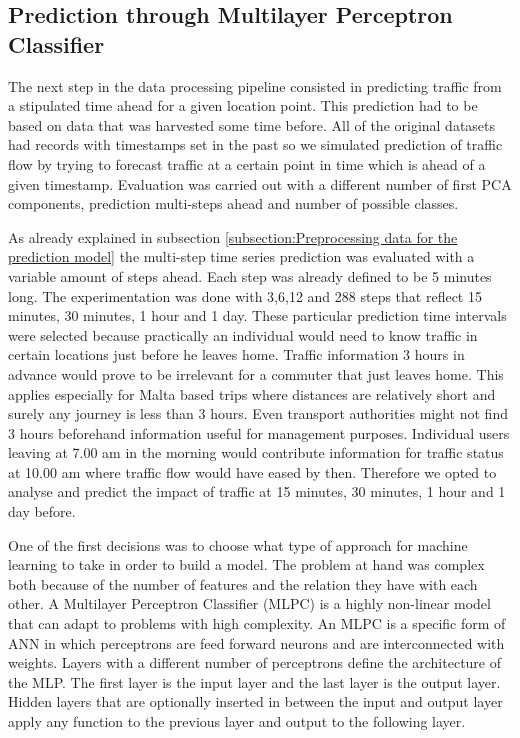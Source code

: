 \documentclass[12pt, a4paper]{report}
\theoremstyle{definition}
\theoremstyle{definition}%
\theoremstyle{definition}%
\theoremstyle{definition}%
\theoremstyle{definition}%
\theoremstyle{definition}%
\begin{document}
\subsection{Prediction through Multilayer Perceptron Classifier}


The next step in the data processing pipeline consisted in predicting traffic from a stipulated time ahead for a given location point. This prediction had to be based on data that was harvested some time before. All of the original datasets had records with timestamps set  in the past so we simulated prediction of traffic flow by trying to forecast traffic at a certain point in time which is ahead of a given timestamp. Evaluation was carried out with a different number of first PCA components, prediction multi-steps ahead and number of possible classes.

As already explained in subsection \ref{subsection:Preprocessing data for the prediction model} the multi-step time series prediction was evaluated with a variable amount of steps ahead. Each step was already defined to be 5 minutes long. The experimentation was done with 3,6,12 and 288 steps that reflect 15 minutes, 30 minutes, 1 hour and 1 day. These particular prediction time intervals were selected because practically an individual would need to know traffic in certain locations just before he leaves home. Traffic information 3 hours in advance would prove to be irrelevant for a commuter that just leaves home. This applies especially for Malta based trips where distances are relatively short and surely any journey is less than 3 hours. Even transport authorities might not find 3 hours beforehand information useful for management purposes. Individual users leaving at 7.00 am in the morning would contribute information for traffic status at 10.00 am where traffic flow would have eased by then. Therefore we opted to analyse and predict the impact of traffic at 15 minutes, 30 minutes, 1 hour and 1 day before.

One of the first decisions was to choose what type of approach for machine learning to take in order to build a model. The problem at hand was complex both because of the number of features and the relation they have with each other. A Multilayer Perceptron Classifier (MLPC) is a highly non-linear model that can adapt to problems with high complexity. An MLPC is a specific form of ANN in which perceptrons are feed forward neurons and are interconnected with weights. Layers with a different number of perceptrons define the architecture of the MLP. The first layer is the input layer and the last layer is the output layer. Hidden layers that are optionally inserted in between the input and output layer apply any function to the previous layer and output to the following layer.
\end{document}
